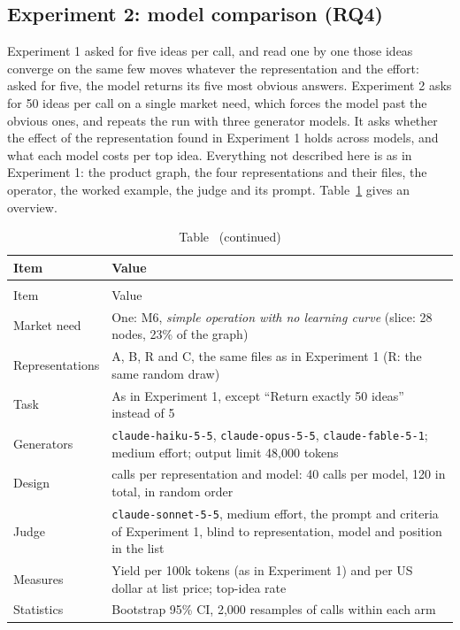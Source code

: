 \hypertarget{experiment-2}{%
\subsection{Experiment 2: model comparison (RQ4)}\label{experiment-2}}

Experiment 1 asked for five ideas per call, and read one by one those ideas converge on the same few moves whatever the representation and the effort: asked for five, the model returns its five most obvious answers. Experiment 2 asks for 50 ideas per call on a single market need, which forces the model past the obvious ones, and repeats the run with three generator models. It asks whether the effect of the representation found in Experiment 1 holds across models, and what each model costs per top idea. Everything not described here is as in Experiment 1: the product graph, the four representations and their files, the operator, the worked example, the judge and its prompt. Table~\ref{tab:setup-exp2} gives an overview.

\begin{longtable}[]{@{}
  >{\raggedright\arraybackslash}p{}
  >{\raggedright\arraybackslash}p{}@{}}
\caption{Experiment 2 at a glance.}\label{tab:setup-exp2}\tabularnewline
\toprule\noalign{}
Item & Value \\
\midrule\noalign{}
\endfirsthead
\caption*{Table~\thetable{} (continued)}\tabularnewline
\toprule\noalign{}
Item & Value \\
\midrule\noalign{}
\endhead
\bottomrule\noalign{}
\endlastfoot
Market need & One: M6, \emph{simple operation with no learning curve} (slice: 28 nodes, 23\% of the graph) \\
Representations & A, B, R and C, the same files as in Experiment 1 (R: the same random draw) \\
Task & As in Experiment 1, except ``Return exactly 50 ideas'' instead of 5 \\
Generators & \texttt{claude-haiku-5-5}, \texttt{claude-opus-5-5}, \texttt{claude-fable-5-1}; medium effort; output limit 48,000 tokens \\
Design & 10 calls per representation and model: 40 calls per model, 120 in total, in random order \\
Judge & \texttt{claude-sonnet-5-5}, medium effort, the prompt and criteria of Experiment 1, blind to representation, model and position in the list \\
Measures & Yield per 100k tokens (as in Experiment 1) and per US dollar at list price; top-idea rate \\
Statistics & Bootstrap 95\% CI, 2,000 resamples of calls within each arm \\
\end{longtable}

